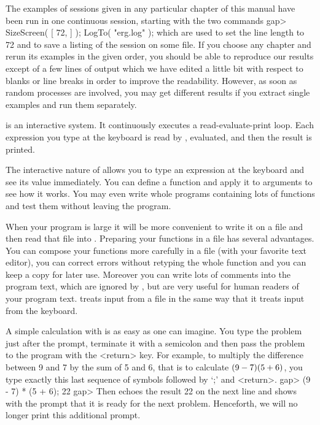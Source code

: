 The examples of  {\GAP} sessions given  in any particular chapter of this
manual have been  run in one continuous   session, starting with the  two
commands
\beginexample
    gap> SizeScreen( [ 72, ] ); LogTo( "erg.log" );
\endexample
which are used to set the line length to 72 and  to save a listing of the
session on some file.  If  you choose any chapter  and rerun its examples
in the given order, you should be able to reproduce our results except of
a few lines of output which we  have edited a  little bit with respect to
blanks or line  breaks in order to  improve the readability.  However, as
soon as  random processes are involved, you  may get different results if
you extract single examples and run them separately.

\null

%
{\GAP}  is  an   interactive   system.    It  continuously   executes   a
read-evaluate-print loop.  Each  expression you type  at the  keyboard is
read by {\GAP}, evaluated, and then the result is printed.

The interactive nature of {\GAP} allows you to type  an expression at the
keyboard and see its value immediately.  You can  define a  function  and
apply it to arguments  to  see how  it  works.  You may  even write whole
programs containing lots  of functions and test them without leaving  the
program.

When  your program is large it  will be more  convenient to write it on a
file and then read that file  into {\GAP}. Preparing  your functions in a
file   has  several advantages.  You  can   compose  your functions  more
carefully in a  file (with your favorite  text  editor), you can  correct
errors without retyping  the whole function and you  can keep a  copy for
later use. Moreover you can write lots of comments into the program text,
which are ignored  by {\GAP}, but are   very useful for  human readers of
your program text. {\GAP} treats  input from a  file in the same way that
it treats input from the keyboard.

A simple calculation with {\GAP} is as easy as one can imagine.  You type
the problem just after the prompt, terminate it with a semicolon and then
pass the problem to the  program with the <return> key.  For  example, to
multiply the difference between 9 and 7 by the sum of 5 and 6, that is to
calculate  $(9 - 7) \* (5 + 6)$, you type exactly this  last sequence  of
symbols followed by `;' and <return>.
\beginexample
    gap> (9 - 7) * (5 + 6);
    22
    gap> 
\endexample
Then {\GAP} echoes   the result 22 on the   next line and shows with  the
prompt  that it is ready  for the  next problem.  Henceforth,  we will no
longer print this additional prompt.

